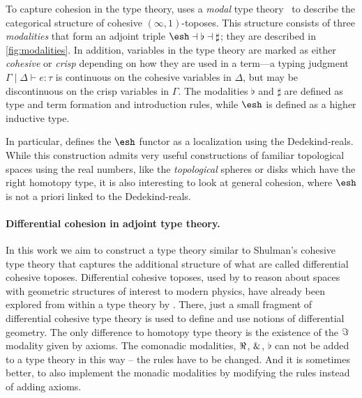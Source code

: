 \documentclass{article}
\begin{document}
To capture cohesion in the type theory, \citet{Shulman2015} uses a \emph{modal}
type theory~\citep{Pfenning2001} to describe the categorical structure of
cohesive $(\infty,1)$-toposes. This structure consists of three
\emph{modalities}  that form an adjoint triple
$\shape \dashv \flat \dashv \sharp$; they are described in
\cref{fig:modalities}. In addition, variables in the type theory are marked as
either \emph{cohesive} or \emph{crisp} depending on how they are used in a
term---a typing judgment $\Gamma \mid \Delta \vdash e : \tau$ is continuous on
the cohesive variables in $\Delta$, but may be discontinuous on the crisp
variables in $\Gamma$. The modalities $\flat$ and $\sharp$ are defined as type
and term formation and introduction rules, while $\shape$ is defined as a higher
inductive type.


In particular, \citeauthor{Shulman2015} defines the $\shape$ functor as a
localization using the Dedekind-reals. While this construction admits very
useful constructions of familiar topological spaces using the real numbers, like
the \emph{topological} spheres or disks which have the right homotopy type, it
is also interesting to look at general cohesion, where $\shape$ is not a priori
linked to the Dedekind-reals.


\paragraph{Differential cohesion in adjoint type theory.}

In this work we aim to construct a type theory similar to Shulman's cohesive
type theory that captures the additional structure of what are called
differential cohesive toposes.  Differential cohesive toposes, used by \citet{Schreiber2013}
to reason about spaces with geometric structures of interest to modern physics,
have already been explored from within a type theory by \citet{Wellen2017}.
There, just a small fragment of differential cohesive type theory is used to
define and use notions of differential geometry. 
The only difference to homotopy type theory
 is the existence of the $\Im$ modality given by axioms.
The comonadic modalities, $\Re$, $\&$, $\flat$ can not be added to a type theory in this way -- 
the rules have to be changed.
And it is sometimes better, to also implement the monadic modalities by modifying the rules instead of adding axioms.
\end{document}
